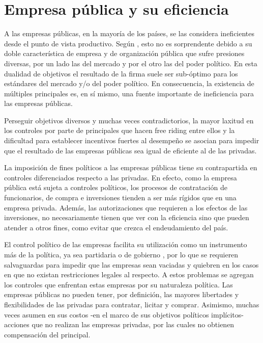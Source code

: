 \documentclass[
  12pt,
  spanish,
]{book}
\begin{document}
\hypertarget{empresa-puxfablica-y-su-eficiencia}{%
\section{Empresa pública y su eficiencia}\label{empresa-puxfablica-y-su-eficiencia}}

A las empresas públicas, en la mayoría de los países, se las considera ineficientes desde el punto de vista productivo. Según \citet{Jones1982}, esto no es sorprendente debido a su doble característica de empresa y de organización pública que sufre presiones diversas, por un lado las del mercado y por el otro las del poder político. En esta dualidad de objetivos el resultado de la firma suele ser sub-óptimo para los estándares del mercado y/o del poder político. En consecuencia, la existencia de múltiples principales es, en sí mismo, una fuente importante de ineficiencia para las empresas públicas.

Perseguir objetivos diversos y muchas veces contradictorios, la mayor laxitud en los controles por parte de principales que hacen free riding entre ellos y la dificultad para establecer incentivos fuertes al desempeño se asocian para impedir que el resultado de las empresas públicas sea igual de eficiente al de las privadas.

La imposición de fines políticos a las empresas públicas \citep{Shleifer1994} tiene su contrapartida en controles diferenciados respecto a las privadas. En efecto, como la empresa pública está sujeta a controles políticos, los procesos de contratación de funcionarios, de compra e inversiones tienden a ser más rígidos que en una empresa privada. Además, las autorizaciones que requieren a los efectos de las inversiones, no necesariamente tienen que ver con la eficiencia sino que pueden atender a otros fines, como evitar que crezca el endeudamiento del país.

El control político de las empresas facilita su utilización como un instrumento más de la política, ya sea partidaria o de gobierno \citep{Miltnisky2001}, por lo que se requieren salvaguardas para impedir que las empresas sean vaciadas y quiebren en los casos en que no existan restricciones legales al respecto. A estos problemas se agregan los controles que enfrentan estas empresas por su naturaleza política. Las empresas públicas no pueden tener, por definición, las mayores libertades y flexibilidades de las privadas para contratar, licitar y comprar. Asimismo, muchas veces asumen en sus costos -en el marco de sus objetivos políticos implícitos- acciones que no realizan las empresas privadas, por las cuales no obtienen compensación del principal.
\end{document}
